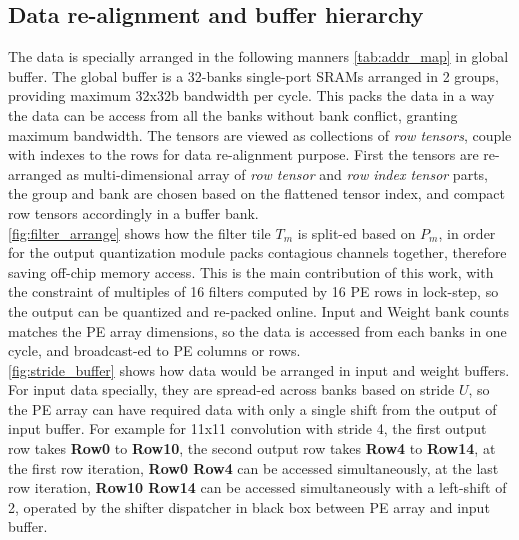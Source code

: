 \subsection{Data re-alignment and buffer hierarchy}
The data is specially arranged in the following manners \autoref{tab:addr_map} in global buffer. The global buffer is a 32-banks single-port SRAMs arranged in 2 groups, providing maximum 32x32b bandwidth per cycle.  This packs the data in a way the data can be access from all the banks without bank conflict, granting maximum bandwidth. The tensors are viewed as collections of \textit{row tensors}, couple with indexes to the rows for data re-alignment purpose. First the tensors are re-arranged as multi-dimensional array of \textit{row tensor} and \textit{row index tensor} parts, the group and bank are chosen based on the flattened tensor index, and compact row tensors accordingly in a buffer bank. \\
\autoref{fig:filter_arrange} shows how the filter tile $T_m$ is split-ed based on $P_m$, in order for the output quantization module packs contagious channels together, therefore saving off-chip memory access. This is the main contribution of this work, with the constraint of multiples of 16 filters computed by 16 PE rows in lock-step, so the output can be quantized and re-packed online. Input and Weight bank counts matches the PE array dimensions, so the data is accessed from each banks in one cycle, and broadcast-ed to PE columns or rows. \\
\autoref{fig:stride_buffer} shows how data would be arranged in input and weight buffers. For input data specially, they are spread-ed across banks based on stride $U$, so the PE array can have required data with only a single shift from the output of input buffer. For example for 11x11 convolution with stride 4, the first output row takes \textbf{Row0} to \textbf{Row10}, the second output row takes \textbf{Row4} to  \textbf{Row14}, at the first row iteration, \textbf{Row0 Row4} can be accessed simultaneously, at the last row iteration, \textbf{Row10 Row14} can be accessed simultaneously with a left-shift of 2, operated by the shifter dispatcher in black box between PE array and input buffer. \\
